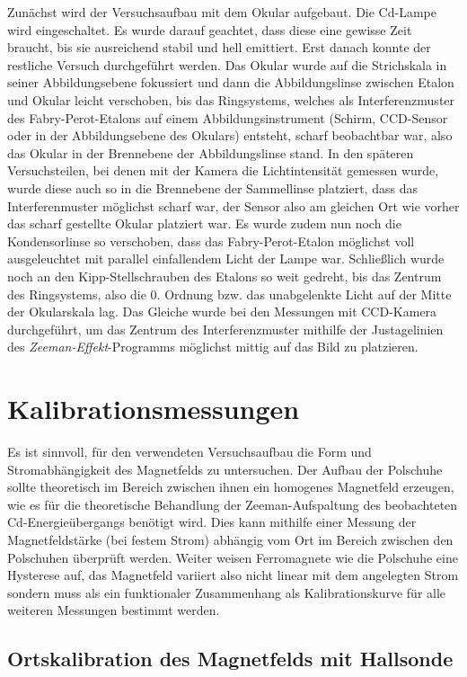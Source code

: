Zunächst wird der Versuchsaufbau mit dem Okular aufgebaut. Die Cd-Lampe wird eingeschaltet. Es wurde darauf geachtet, dass diese eine gewisse Zeit braucht, bis sie ausreichend stabil und hell emittiert. Erst danach konnte der restliche Versuch durchgeführt werden. Das Okular wurde auf die Strichskala in seiner Abbildungsebene fokussiert und dann die Abbildungslinse zwischen Etalon und Okular leicht verschoben, bis das Ringsystems, welches als Interferenzmuster des Fabry-Perot-Etalons auf einem Abbildungsinstrument (Schirm, CCD-Sensor oder in der Abbildungsebene des Okulars) entsteht, scharf beobachtbar war, also das Okular in der Brennebene der Abbildungslinse stand. In den späteren Versuchsteilen, bei denen mit der Kamera die Lichtintensität gemessen wurde, wurde diese auch so in die Brennebene der Sammellinse platziert, dass das Interferenmuster möglichst scharf war, der Sensor also am gleichen Ort wie vorher das scharf gestellte Okular platziert war. Es wurde zudem nun noch die Kondensorlinse so verschoben, dass das Fabry-Perot-Etalon möglichst voll ausgeleuchtet mit parallel einfallendem Licht der Lampe war. Schließlich wurde noch an den Kipp-Stellschrauben des Etalons so weit gedreht, bis das Zentrum des Ringsystems, also die 0. Ordnung bzw. das unabgelenkte Licht auf der Mitte der Okularskala lag. Das Gleiche wurde bei den Messungen mit CCD-Kamera durchgeführt, um das Zentrum des Interferenzmuster mithilfe der Justagelinien des \textit{Zeeman-Effekt}-Programms möglichst mittig auf das Bild zu platzieren.

\section{Kalibrationsmessungen}

Es ist sinnvoll, für den verwendeten Versuchsaufbau die Form und Stromabhängigkeit des Magnetfelds zu untersuchen. Der Aufbau der Polschuhe sollte theoretisch im Bereich zwischen ihnen ein homogenes Magnetfeld erzeugen, wie es für die theoretische Behandlung der Zeeman-Aufspaltung des beobachteten Cd-Energieübergangs benötigt wird. Dies kann mithilfe einer Messung der Magnetfeldstärke (bei festem Strom) abhängig vom Ort im Bereich zwischen den Polschuhen überprüft werden. Weiter weisen Ferromagnete wie die Polschuhe eine Hysterese auf, das Magnetfeld variiert also nicht linear mit dem angelegten Strom sondern muss als ein funktionaler Zusammenhang als Kalibrationskurve für alle weiteren Messungen bestimmt werden.


\subsection{Ortskalibration des Magnetfelds mit Hallsonde}

